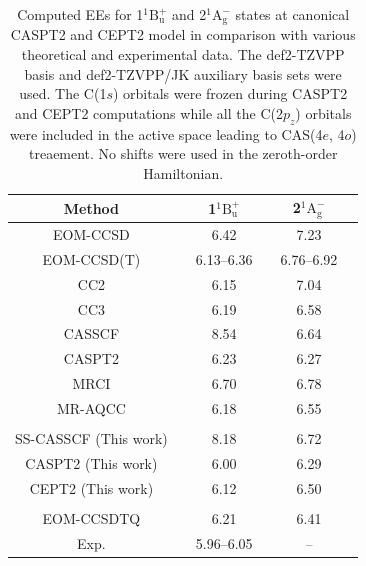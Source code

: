 \documentclass[aip,jcp,amsmath]{revtex4-1}
\begin{document}
\clearpage

{
\begin{longtable}[!ht]{cccccc}
  \caption{\label{tab:butadiene}
    Computed EEs for 1${}^1\text{B}_\text{u}^{+}$ and 2${}^1\text{A}_\text{g}^{-}$ states at canonical CASPT2 and CEPT2 model in comparison with various theoretical and experimental data.
    The def2-TZVPP basis and def2-TZVPP/JK auxiliary basis sets were used.
    The C(1$s$) orbitals were frozen during CASPT2 and CEPT2 computations while all the C(2$p_z$) orbitals were included in the active space leading to CAS(4$e$, 4$o$) treaement.
    No shifts were used in the zeroth-order Hamiltonian.
}
\\
\hline
\hline
Method && 1${}^1\text{B}_\text{u}^{+}$ && 2${}^1\text{A}_\text{g}^{-}$ \\
\hline

EOM-CCSD\cite{doi:10.1063/1.471988}    && 6.42       && 7.23       \\
EOM-CCSD(T)\cite{doi:10.1063/1.471988} && 6.13--6.36 && 6.76--6.92 \\
CC2\cite{doi:10.1063/1.3158990}        && 6.15       && 7.04       \\
CC3\cite{doi:10.1063/1.3158990}        && 6.19       && 6.58       \\
CASSCF\cite{doi:10.1063/1.465071}      && 8.54       && 6.64       \\
CASPT2\cite{doi:10.1063/1.465071}      && 6.23       && 6.27       \\
MRCI\cite{SZALAY1989219}               && 6.70       && 6.78       \\
MR-AQCC\cite{Dallos2004}               && 6.18       && 6.55       \\
\\
SS-CASSCF (This work)   && 8.18       && 6.72       \\
CASPT2 (This work)      && 6.00       && 6.29       \\
CEPT2 (This work)       && 6.12       && 6.50       \\
\\
EOM-CCSDTQ\cite{doi:10.1021/ct300591z} && 6.21       && 6.41 \\
Exp.\cite{doi:10.1063/1.440587}        && 5.96--6.05 && --   \\
\hline
\hline
\end{longtable}

}
\end{document}
